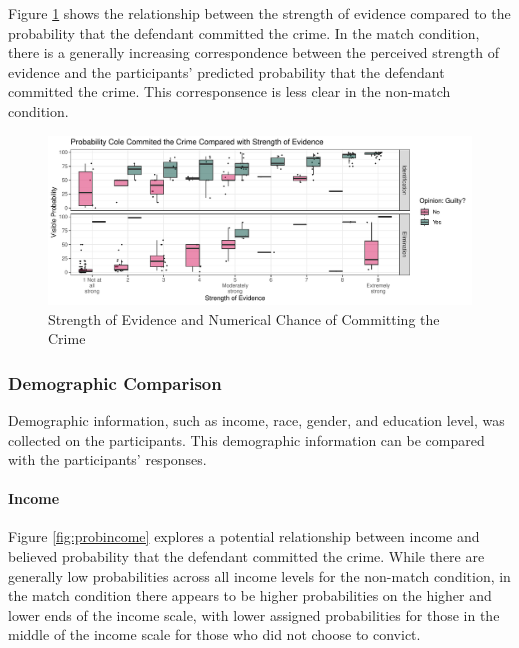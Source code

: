 \documentclass[print]{nuthesis}
\begin{document}
Figure \ref{fig:strengthprob} shows the relationship between the strength of evidence compared to the probability that the defendant committed the crime.
In the match condition, there is a generally increasing correspondence between the perceived strength of evidence and the participants' predicted probability that the defendant committed the crime.
This corresponsence is less clear in the non-match condition.

\begin{figure}

{\centering \includegraphics[width=\linewidth]{thesis_files/figure-latex/strengthprob-1} 

}

\caption{Strength of Evidence and Numerical Chance of Committing the Crime}\label{fig:strengthprob}
\end{figure}

\hypertarget{demographic-comparison}{%
\subsubsection{Demographic Comparison}\label{demographic-comparison}}

Demographic information, such as income, race, gender, and education level, was collected on the participants.
This demographic information can be compared with the participants' responses.

\hypertarget{income}{%
\paragraph{Income}\label{income}}

Figure \ref{fig:probincome} explores a potential relationship between income and believed probability that the defendant committed the crime.
While there are generally low probabilities across all income levels for the non-match condition, in the match condition there appears to be higher probabilities on the higher and lower ends of the income scale, with lower assigned probabilities for those in the middle of the income scale for those who did not choose to convict.
\end{document}
